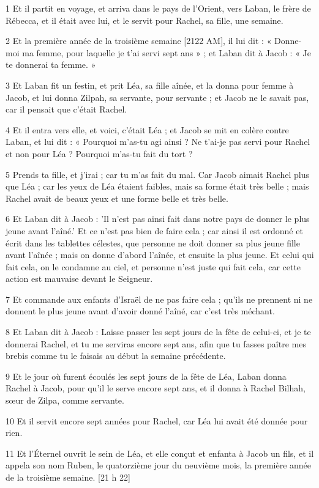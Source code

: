 \par 1 Et il partit en voyage, et arriva dans le pays de l'Orient, vers Laban, le frère de Rébecca, et il était avec lui, et le servit pour Rachel, sa fille, une semaine.
\par 2 Et la première année de la troisième semaine [2122 AM], il lui dit : « Donne-moi ma femme, pour laquelle je t'ai servi sept ans » ; et Laban dit à Jacob : « Je te donnerai ta femme. »
\par 3 Et Laban fit un festin, et prit Léa, sa fille aînée, et la donna pour femme à Jacob, et lui donna Zilpah, sa servante, pour servante ; et Jacob ne le savait pas, car il pensait que c'était Rachel.
\par 4 Et il entra vers elle, et voici, c'était Léa ; et Jacob se mit en colère contre Laban, et lui dit : « Pourquoi m'as-tu agi ainsi ? Ne t'ai-je pas servi pour Rachel et non pour Léa ? Pourquoi m'as-tu fait du tort ?
\par 5 Prends ta fille, et j'irai ; car tu m'as fait du mal. Car Jacob aimait Rachel plus que Léa ; car les yeux de Léa étaient faibles, mais sa forme était très belle ; mais Rachel avait de beaux yeux et une forme belle et très belle.
\par 6 Et Laban dit à Jacob : 'Il n'est pas ainsi fait dans notre pays de donner le plus jeune avant l'aîné.' Et ce n’est pas bien de faire cela ; car ainsi il est ordonné et écrit dans les tablettes célestes, que personne ne doit donner sa plus jeune fille avant l'aînée ; mais on donne d'abord l'aînée, et ensuite la plus jeune. Et celui qui fait cela, on le condamne au ciel, et personne n'est juste qui fait cela, car cette action est mauvaise devant le Seigneur.
\par 7 Et commande aux enfants d'Israël de ne pas faire cela ; qu'ils ne prennent ni ne donnent le plus jeune avant d'avoir donné l'aîné, car c'est très méchant.
\par 8 Et Laban dit à Jacob : Laisse passer les sept jours de la fête de celui-ci, et je te donnerai Rachel, et tu me serviras encore sept ans, afin que tu fasses paître mes brebis comme tu le faisais au début la semaine précédente.
\par 9 Et le jour où furent écoulés les sept jours de la fête de Léa, Laban donna Rachel à Jacob, pour qu'il le serve encore sept ans, et il donna à Rachel Bilhah, sœur de Zilpa, comme servante.
\par 10 Et il servit encore sept années pour Rachel, car Léa lui avait été donnée pour rien.
\par 11 Et l'Éternel ouvrit le sein de Léa, et elle conçut et enfanta à Jacob un fils, et il appela son nom Ruben, le quatorzième jour du neuvième mois, la première année de la troisième semaine. [21 h 22]
